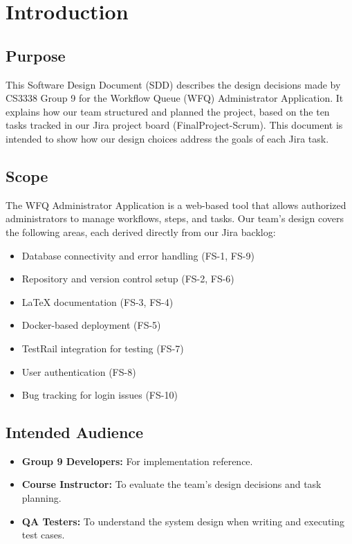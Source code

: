 \documentclass[12pt]{article}
\begin{document}
\section{Introduction}
 
\subsection{Purpose}
This Software Design Document (SDD) describes the design decisions made by CS3338 Group 9
for the Workflow Queue (WFQ) Administrator Application. It explains how our team structured
and planned the project, based on the ten tasks tracked in our Jira project board
(FinalProject-Scrum). This document is intended to show how our design choices address the
goals of each Jira task.
 
\subsection{Scope}
The WFQ Administrator Application is a web-based tool that allows authorized administrators
to manage workflows, steps, and tasks. Our team's design covers the following areas, each
derived directly from our Jira backlog:
 
\begin{itemize}
    \item Database connectivity and error handling (FS-1, FS-9)
    \item Repository and version control setup (FS-2, FS-6)
    \item LaTeX documentation (FS-3, FS-4)
    \item Docker-based deployment (FS-5)
    \item TestRail integration for testing (FS-7)
    \item User authentication (FS-8)
    \item Bug tracking for login issues (FS-10)
\end{itemize}
 
\subsection{Intended Audience}
\begin{itemize}
    \item \textbf{Group 9 Developers:} For implementation reference.
    \item \textbf{Course Instructor:} To evaluate the team's design decisions and task
    planning.
    \item \textbf{QA Testers:} To understand the system design when writing and executing
    test cases.
\end{itemize}
 
\end{document}
